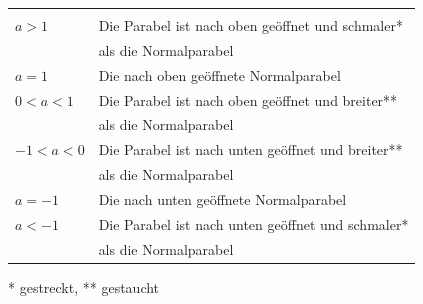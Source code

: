 \documentclass[a4paper,10pt]{article}
\begin{document}
\begin{multicols}{3}
    \begin{tabular}{l|l}
                     &                                         \\
        $a > 1$      & Die Parabel ist nach oben geöffnet und
        schmaler*                                              \\
                     & als die Normalparabel                   \\ \hline
        $a = 1$      & Die nach oben geöffnete Normalparabel   \\ \hline
        $0 < a < 1$  & Die Parabel ist nach oben geöffnet und
        breiter**                                              \\
                     & als die Normalparabel                   \\ \hline
        $-1 < a < 0$ & Die Parabel ist nach unten geöffnet und
        breiter**                                              \\
                     & als die Normalparabel                   \\ \hline
        $a = -1$     & Die nach unten geöffnete Normalparabel  \\ \hline
        $a < -1$     & Die Parabel ist nach unten geöffnet und
        schmaler*                                              \\
                     & als die Normalparabel                   \\ \hline
    \end{tabular}
    * gestreckt, ** gestaucht \\~\\
\end{multicols}
\end{document}
